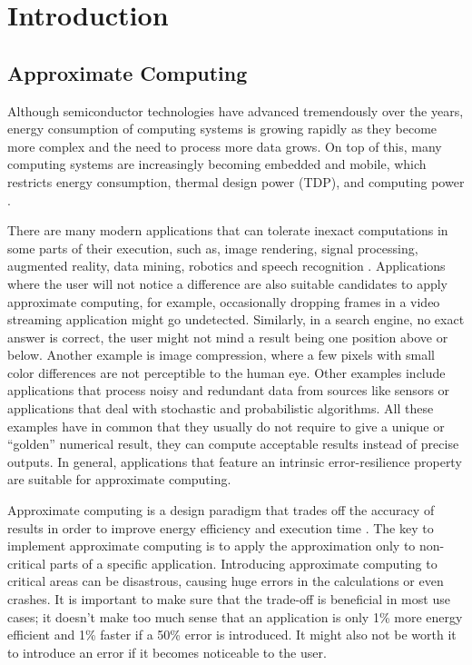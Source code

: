 \chapter{Introduction}
\label{ch:intro}

\section{Approximate Computing}

Although semiconductor technologies have advanced tremendously over the years, energy consumption of computing systems is growing rapidly as they become more complex and the need to process more data grows. On top of this, many computing systems are increasingly becoming embedded and mobile, which restricts energy consumption, thermal design power (TDP), and computing power \cite{Xu2016}.

There are many modern applications that can tolerate inexact computations in some parts of their execution, such as, image rendering, signal processing, augmented reality, data mining, robotics and speech recognition \cite{Yazdanbakhsh2016}. Applications where the user will not notice a difference are also suitable candidates to apply approximate computing, for example, occasionally dropping frames in a video streaming application might go undetected. Similarly, in a search engine, no exact answer is correct, the user might not mind a result being one position above or below. Another example is image compression, where a few pixels with small color differences are not perceptible to the human eye. Other examples include applications that process noisy and redundant data from sources like sensors or applications that deal with stochastic and probabilistic algorithms. All these examples have in common that they usually do not require to give a unique or ``golden'' numerical result, they can compute acceptable results instead of precise outputs. In general, applications that feature an intrinsic error-resilience property are suitable for approximate computing.

Approximate computing is a design paradigm that trades off the accuracy of results in order to improve energy efficiency and execution time \cite{Han2013}. The key to implement approximate computing is to apply the approximation only to non-critical parts of a specific application. Introducing approximate computing to critical areas can be disastrous, causing huge errors in the calculations or even crashes. It is important to make sure that the trade-off is beneficial in most use cases; it doesn't make too much sense that an application is only 1\% more energy efficient and 1\% faster if a 50\% error is introduced. It might also not be worth it to introduce an error if it becomes noticeable to the user.

